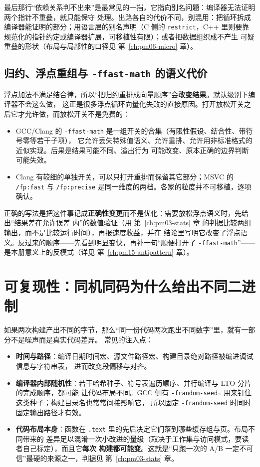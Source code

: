 \documentclass[12pt,a4paper,fontset=fandol]{ctexbook}
\newcommand{\Tp}[1]{\texttt{#1}}
\newcommand{\Lang}[1]{\textsf{#1}}
\newcommand{\CL}{\Lang{C}}
\newcommand{\CPP}{\Lang{C++}}
\begin{document}
最后那行``依赖关系判不出来''是最常见的一挡，它指向别名问题：编译器无法证明两个指针不重叠，就只能保守
处理。出路各自的代价不同，别混用：把循环拆成编译器能证明的部分；用语言层的别名声明（\CL{} 侧的
\Tp{restrict}，\CPP{} 里则要靠规范化的指针约定或编译器扩展，可移植性有限）；或者把数据组织成不产生
可疑重叠的形状（布局与局部性的口径见 第~\ref{ch:pm06-micro} 章）。

\subsection{归约、浮点重组与 \Tp{-ffast-math} 的语义代价}

浮点加法不满足结合律，所以``把归约重排成向量顺序''会\textbf{改变结果}。默认级别下编译器不会这么做，
这正是很多浮点循环向量化失败的直接原因。打开放松开关之后它才允许做，而放松开关不是免费的：

\begin{itemize}
  \item GCC/Clang 的 \Tp{-ffast-math} 是一组开关的合集（有限性假设、结合性、带符号零等若干子项），
        它允许丢失特殊值语义、允许重排、允许用非标准格式的近似实现。后果是结果可能不同、溢出行为
        可能改变、原本正确的边界判断可能失效。
  \item Clang 有较细的单独开关，可以只打开重排而保留其它部分；MSVC 的 \Tp{/fp:fast} 与
        \Tp{/fp:precise} 是同一维度的两档。各家的粒度并不可移植，逐项确认。
\end{itemize}

正确的写法是把这件事记成\textbf{正确性变更}而不是优化：需要放松浮点语义时，先给出``结果差在允许误差
内''的数值验证（用 第~\ref{ch:pm03-stats} 章 的判据比较两组输出，而不是比较运行时间），再报速度收益，并在
结论里写明它改变了浮点语义。反过来的顺序——先看到明显变快，再补一句``顺便打开了 \Tp{-ffast-math}''——
是本册意义上的反模式（详见 第~\ref{ch:pm15-antipattern} 章）。

\section{可复现性：同机同码为什么给出不同二进制}
\label{sec:pm10-repro}

如果两次构建产出不同的字节，那么``同一份代码两次跑出不同数字''里，就有一部分不是噪声而是真实代码差异。
常见的注入点：

\begin{itemize}
  \item \textbf{时间与路径}：编译日期时间宏、源文件路径宏、构建目录绝对路径被编进调试信息与字符串表，
        进而改变段偏移与对齐。
  \item \textbf{编译器内部随机性}：若干哈希种子、符号表遍历顺序、并行编译与 LTO 分片的完成顺序，都可能
        让代码布局不同。GCC 侧有 \Tp{-frandom-seed=} 用来钉住这类种子；构建目录名也常常间接影响它，
        所以固定 \Tp{-frandom-seed} 时同时固定输出路径才有效。
  \item \textbf{代码布局本身}：函数在 \Tp{.text} 里的先后决定它们落到哪些缓存组与页。布局不同带来的
        差异足以混淆一次小改进的量级（取决于工作集与访问模式，要读者自己标定），而且它\textbf{每次
        构建都可能变}。这就是``只跑一次的 A/B 一定不可信''最硬的来源之一，判据见
        第~\ref{ch:pm03-stats} 章。
\end{itemize}
\end{document}
